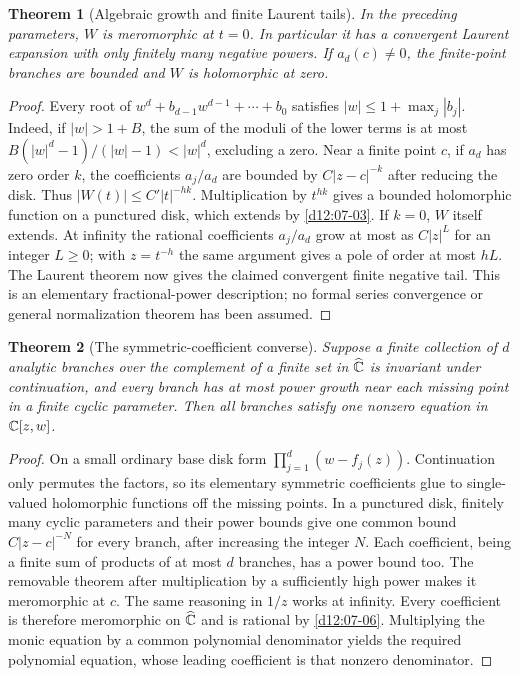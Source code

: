 \documentclass[11pt,a4paper,openany]{book}
\newtheorem{theorem}{Theorem}[chapter]
\theoremstyle{definition}
\theoremstyle{remark}\newtheorem{remark}[theorem]{Remark}
\newcommand{\family}[1]{}
\begin{document}
\begin{theorem}[Algebraic growth and finite Laurent tails]\label{d12:21-05}\family{D12.21.05}
In the preceding parameters, $W$ is meromorphic at $t=0$. In particular
it has a convergent Laurent expansion with only finitely many negative
powers. If $a_d(c)\ne0$, the finite-point branches are bounded and
$W$ is holomorphic at zero.
\end{theorem}
\begin{proof}
Every root of $w^d+b_{d-1}w^{d-1}+\cdots+b_0$ satisfies
$|w|\le1+\max_j|b_j|$. Indeed, if $|w|>1+B$, the sum of the moduli of
the lower terms is at most
$B(|w|^d-1)/(|w|-1)<|w|^d$, excluding a zero.
Near a finite point $c$, if $a_d$ has zero order $k$, the coefficients
$a_j/a_d$ are bounded by $C|z-c|^{-k}$ after reducing the disk. Thus
$|W(t)|\le C'|t|^{-hk}$. Multiplication by $t^{hk}$ gives a bounded
holomorphic function on a punctured disk, which extends by
\cref{d12:07-03}. If $k=0$, $W$ itself extends. At infinity the rational
coefficients $a_j/a_d$ grow at most as $C|z|^L$ for an integer $L\ge0$;
with $z=t^{-h}$ the same argument gives a pole of order at most $hL$.
The Laurent theorem now gives the claimed convergent finite negative
tail. This is an elementary fractional-power description; no formal
series convergence or general normalization theorem has been assumed.
\end{proof}

\begin{theorem}[The symmetric-coefficient converse]\label{d12:21-06}\family{D12.21.06}
Suppose a finite collection of $d$ analytic branches over the complement
of a finite set in $\widehat{\mathbb C}$ is invariant under continuation, and every
branch has at most power growth near each missing point in a finite
cyclic parameter. Then all branches satisfy one nonzero equation in
$\mathbb C[z,w]$.
\end{theorem}
\begin{proof}
On a small ordinary base disk form $\prod_{j=1}^d(w-f_j(z))$.
Continuation only permutes the factors, so its elementary symmetric
coefficients glue to single-valued holomorphic functions off the missing
points. In a punctured disk, finitely many cyclic parameters and their
power bounds give one common bound $C|z-c|^{-N}$ for every branch,
after increasing the integer $N$. Each coefficient, being a finite sum
of products of at most $d$ branches, has a power bound too. The removable
theorem after multiplication by a sufficiently high power makes it
meromorphic at $c$. The same reasoning in $1/z$ works at infinity.
Every coefficient is therefore meromorphic on $\widehat{\mathbb C}$ and is rational
by \cref{d12:07-06}. Multiplying the monic equation by a common
polynomial denominator yields the required polynomial equation, whose
leading coefficient is that nonzero denominator.
\end{proof}
\end{document}
